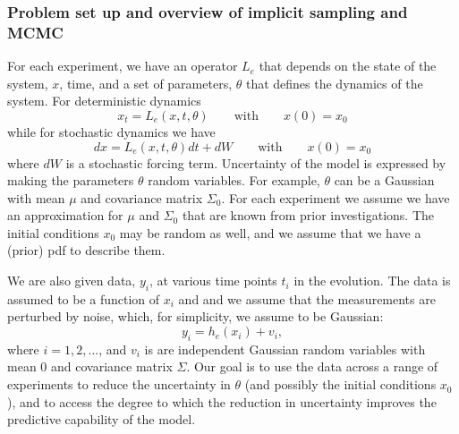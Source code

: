\documentclass[11pt]{article}
\begin{document}
\subsubsection*{Problem set up and overview of implicit sampling and MCMC}
For each experiment,  we have an operator $L_e$ that depends on the state of the system, $x$, time,
and a set of parameters, $\theta$ that defines the dynamics of the system. For deterministic 
dynamics
\begin{equation}
\label{eq:ModelEquation}
x_t = L_e(x,t,\theta) \qquad \mathrm{with} \qquad x(0) = x_0
\end{equation}
while for stochastic dynamics we have
\begin{equation}
\label{eq:ModelEquationSt}
dx = L_e(x,t,\theta) dt + dW \qquad \mathrm{with} \qquad x(0) = x_0
\end{equation}
where $dW$ is a stochastic forcing term. 
Uncertainty of the model is expressed by making the parameters $\theta$ random variables.
For example, $\theta$ can be a Gaussian with mean $\mu$ and covariance matrix $\Sigma_0$.
For each experiment we 
assume we have an approximation for $\mu$ and $\Sigma_0$ that are known from prior investigations.
The initial conditions $x_0$ may be random as well, and we assume that we have a (prior) pdf to describe them.

We are also given data, $y_i$, at various time points $t_i$ in the evolution.
The data is assumed to be a function of $x_i$ and
and we assume that the measurements are perturbed by noise, which, for simplicity, we assume to be Gaussian:
\begin{equation}
	\label{eq:DataEquation}
	y_i = h_e(x_i)+v_i,
\end{equation}
where $i=1,2,\dots$, and $v_i$ is are independent Gaussian random variables with mean $0$ and covariance matrix $\Sigma$.
Our goal is to use the data across a range of experiments to reduce the uncertainty in $\theta$ (and possibly the initial conditions $x_0$), and to 
access the degree to which the reduction in uncertainty improves the predictive capability of the model.
\end{document}
